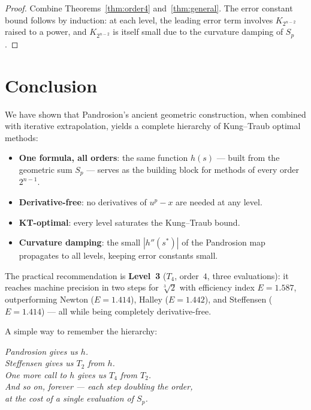 \documentclass[11pt,a4paper]{article}
\theoremstyle{definition}
\newcommand{\cbrt}[1]{\sqrt[3]{#1}}
\begin{document}
\begin{proof}
Combine Theorems~\ref{thm:order4} and~\ref{thm:general}.  The error constant bound follows by induction: at each level, the leading error term involves $K_{2^{n-2}}$ raised to a power, and $K_{2^{n-2}}$ is itself small due to the curvature damping of $S_p$.
\end{proof}

\section{Conclusion}
\label{sec:conclusion}

We have shown that Pandrosion's ancient geometric construction, when combined with iterative extrapolation, yields a complete hierarchy of Kung--Traub optimal methods:

\begin{itemize}
  \item \textbf{One formula, all orders}: the same function $h(s)$ --- built from the geometric sum $S_p$ --- serves as the building block for methods of every order $2^{n-1}$.
  \item \textbf{Derivative-free}: no derivatives of $u^p - x$ are needed at any level.
  \item \textbf{KT-optimal}: every level saturates the Kung--Traub bound.
  \item \textbf{Curvature damping}: the small $|h''(s^*)|$ of the Pandrosion map propagates to all levels, keeping error constants small.
\end{itemize}

The practical recommendation is \textbf{Level~3} ($T_4$, order~$4$, three evaluations): it reaches machine precision in two steps for $\cbrt{2}$ with efficiency index $E = 1.587$, outperforming Newton ($E = 1.414$), Halley ($E = 1.442$), and Steffensen ($E = 1.414$) --- all while being completely derivative-free.

\medskip

A simple way to remember the hierarchy:
\begin{center}
\itshape
Pandrosion gives us $h$.\\
Steffensen gives us $T_2$ from $h$.\\
One more call to $h$ gives us $T_4$ from $T_2$.\\
And so on, forever --- each step doubling the order,\\
at the cost of a single evaluation of $S_p$.
\end{center}
\end{document}
